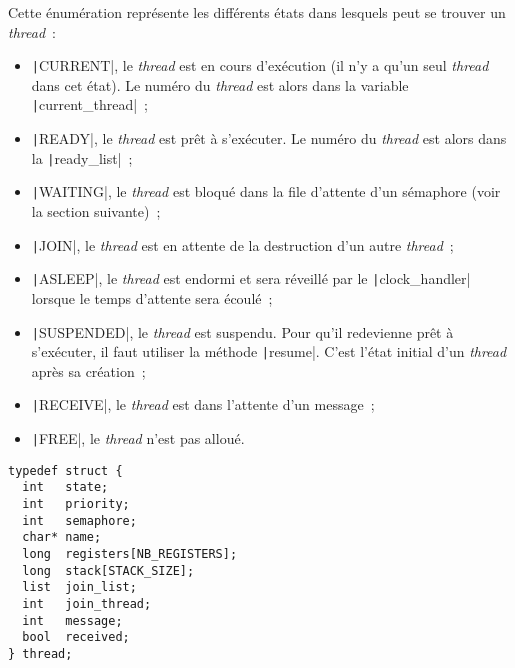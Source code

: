 \documentclass[a4paper]{article}
\begin{document}
Cette énumération représente les différents états dans lesquels peut se trouver un \emph{thread}~:\\
\begin{itemize}
\item \texttt|CURRENT|, le \emph{thread} est en cours d'exécution (il n'y a qu'un seul \emph{thread} dans cet état). Le numéro du
\emph{thread} est alors dans la variable \texttt|current_thread|~;\\
\item \texttt|READY|, le \emph{thread} est prêt à s'exécuter. Le numéro du \emph{thread} est alors dans la \texttt|ready_list|~;\\
\item \texttt|WAITING|, le \emph{thread} est bloqué dans la file d'attente d'un sémaphore (voir la section suivante)~;\\
\item \texttt|JOIN|, le \emph{thread} est en attente de la destruction d'un autre \emph{thread}~;\\
\item \texttt|ASLEEP|, le \emph{thread} est endormi et sera réveillé par le \texttt|clock_handler| lorsque le temps d'attente sera écoulé~;\\
\item \texttt|SUSPENDED|, le \emph{thread} est suspendu. Pour qu'il redevienne prêt à s'exécuter, il faut utiliser la méthode \texttt|resume|. C'est
l'état initial d'un \emph{thread} après sa création~;\\
\item \texttt|RECEIVE|, le \emph{thread} est dans l'attente d'un message~;\\
\item \texttt|FREE|, le \emph{thread} n'est pas alloué.\\
\end{itemize}

\begin{verbatim}
typedef struct {
  int   state;
  int   priority;
  int   semaphore;
  char* name;     
  long  registers[NB_REGISTERS];
  long  stack[STACK_SIZE];
  list  join_list;
  int   join_thread;
  int   message;
  bool  received;
} thread;
\end{verbatim}
\end{document}
